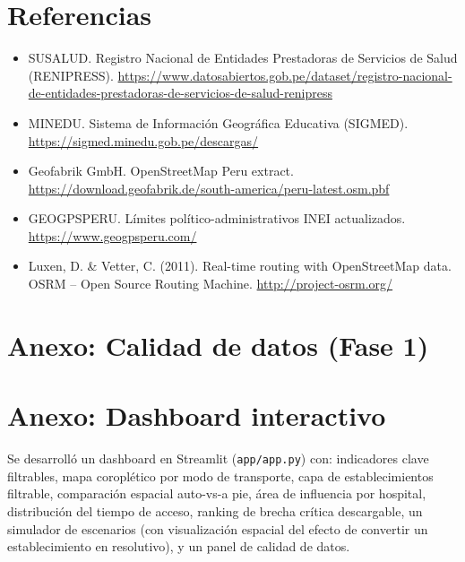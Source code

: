 \documentclass[11pt,a4paper]{article}
\begin{document}
\section{Referencias}
\small
\begin{itemize}
\setlength{\itemsep}{2pt}
  \item SUSALUD. Registro Nacional de Entidades Prestadoras de Servicios de
  Salud (RENIPRESS). \url{https://www.datosabiertos.gob.pe/dataset/registro-nacional-de-entidades-prestadoras-de-servicios-de-salud-renipress}
  \item MINEDU. Sistema de Información Geográfica Educativa (SIGMED).
  \url{https://sigmed.minedu.gob.pe/descargas/}
  \item Geofabrik GmbH. OpenStreetMap Peru extract.
  \url{https://download.geofabrik.de/south-america/peru-latest.osm.pbf}
  \item GEOGPSPERU. Límites político-administrativos INEI actualizados.
  \url{https://www.geogpsperu.com/}
  \item Luxen, D. \& Vetter, C. (2011). Real-time routing with OpenStreetMap
  data. OSRM -- Open Source Routing Machine. \url{http://project-osrm.org/}
\end{itemize}

\section*{Anexo: Calidad de datos (Fase 1)}

{\renewcommand{\arraystretch}{0.75}
\begin{table}[H]
  \centering
  \caption{Reporte de calidad de datos -- RENIPRESS.}
  \label{tab:calidad_renipress}
  \small
  
\end{table}

\begin{table}[H]
  \centering
  \caption{Reporte de calidad de datos -- SIGMED.}
  \label{tab:calidad_sigmed}
  \small
  
\end{table}
}

\section*{Anexo: Dashboard interactivo}
\label{sec:dashboard}

Se desarrolló un dashboard en Streamlit (\texttt{app/app.py}) con: indicadores
clave filtrables, mapa coroplético por modo de transporte, capa de
establecimientos filtrable, comparación espacial auto-vs-a pie, área de
influencia por hospital, distribución del tiempo de acceso, ranking de
brecha crítica descargable, un simulador de escenarios (con visualización
espacial del efecto de convertir un establecimiento en resolutivo), y un
panel de calidad de datos.
\end{document}
